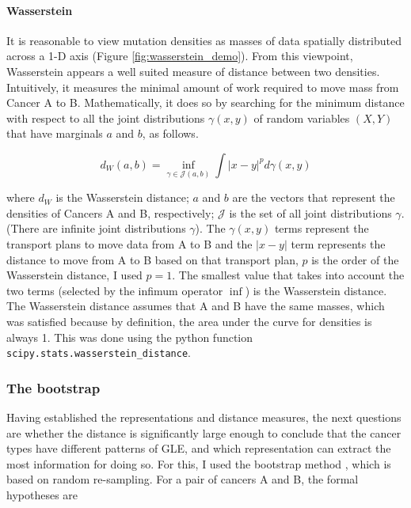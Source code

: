 \paragraph{Wasserstein} It is reasonable to view mutation densities as masses of data spatially distributed across a 1-D axis (Figure \ref{fig:wasserstein_demo}). From this viewpoint, Wasserstein appears a well suited measure of distance between two densities. Intuitively, it measures the minimal amount of work required to move mass from Cancer A to B. Mathematically, it does so by searching for the minimum distance with respect to all the joint distributions $\gamma(x,y)$ of random variables $(X,Y)$ that have \glspl{marginal} $a$ and $b$, as follows.

\begin{equation}
    d_W(a,b) = \underset{\gamma \in \mathcal{J}(a,b)}{\inf} \int |x-y|^p d \gamma(x,y) 
    \label{eq:wassertein}
\end{equation}

where $d_W$ is the Wasserstein distance; $a$ and $b$ are the vectors that represent the densities of Cancers A and B, respectively; $\mathcal{J}$ is the set of all joint distributions $\gamma$. (There are infinite joint distributions $\gamma$). The $\gamma(x,y)$ terms represent the transport plans to move data from A to B and the $|x-y|$ term represents the distance to move from A to B based on that transport plan, $p$ is the order of the Wasserstein distance, I used $p=1$. The smallest value that takes into account the two terms (selected by the infimum operator $\inf$) is the Wasserstein distance. The Wasserstein distance assumes that A and B have the same masses, which was satisfied because by definition, the area under the curve for densities is always 1. This was done using the python function \texttt{scipy.stats.wasserstein\_distance}.


\subsubsection{The bootstrap}

Having established the representations and distance measures, the next questions are whether the distance is significantly large enough to conclude that the cancer types have different patterns of GLE, and which representation can extract the most information for doing so. For this, I used the bootstrap method \citep{Singh2010BootstrapMethod}, which is based on random re-sampling. For a pair of cancers A and B, the formal hypotheses are

